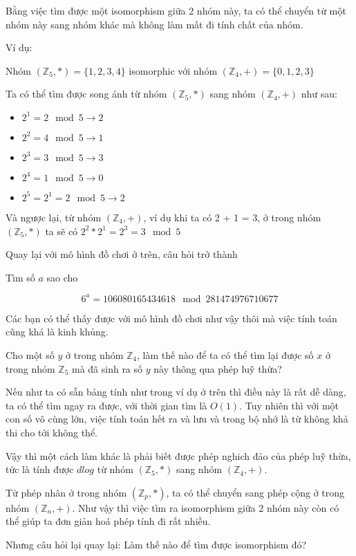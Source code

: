 \documentclass[a4paper,12pt]{article}
\begin{document}
Bằng việc tìm được một isomorphism giữa 2 nhóm này, ta có thể chuyển từ
một nhóm này sang nhóm khác mà không làm mất đi tính chất của nhóm.

Ví dụ:

\begin{mdframed}
    Nhóm \((\mathbb{Z}_5, *) = \{ 1,2,3,4\} \) isomorphic với nhóm \((\mathbb{Z}_4, +) = \{ 0,1,2,3 \} \)\

    Ta có thể tìm được song ánh từ nhóm \((\mathbb{Z}_5, *)\) sang nhóm \((\mathbb{Z}_4, +)\) như sau:
    \begin{itemize}
        \item \(2^1 = 2 \mod 5 \to 2\)
        \item \(2^2 = 4 \mod 5 \to 1\)
        \item \(2^3 = 3 \mod 5 \to 3\)
        \item \(2^4 = 1 \mod 5 \to 0\)
        \item \(2^5 = 2^1 = 2 \mod 5 \to 2\)
    \end{itemize}

    Và ngược lại, từ nhóm \((\mathbb{Z}_4, +)\), ví dụ khi ta có 2 + 1 = 3, ở trong
    nhóm \((\mathbb{Z}_5, *)\) ta sẽ có \(2^2 * 2^1 = 2^3 = 3 \mod 5\)
\end{mdframed}

Quay lại với mô hình đồ chơi ở trên, câu hỏi trở thành

Tìm số \(a\) sao cho

\[6^a = 106080165434618 \mod 281474976710677\]

Các bạn có thể thấy được với mô hình đồ chơi như vậy thôi mà việc tính toán cũng khá là kinh khủng.

Cho một số \(y\) ở trong nhóm \(\mathbb{Z}_4\), làm thế nào để ta có thể tìm lại được
số \(x\) ở trong nhóm \(\mathbb{Z}_5\) mà đã sinh ra số \(y\) này thông qua phép luỹ thừa?

Nếu như ta có sẵn bảng tính như trong ví dụ ở trên thì điều này là rất dễ dàng, ta có thể
tìm ngay ra được, với thời gian tìm là \(O(1)\). Tuy nhiên thì với một con số vô cùng lớn,
việc tính toán hết ra và lưu và trong bộ nhớ là từ không khả thi cho tới không thể.

Vậy thì một cách làm khác là phải biết được phép nghich đảo của phép luỹ thừa, tức là tính được \(dlog\)
từ nhóm \((\mathbb{Z}_5, *)\) sang nhóm \((\mathbb{Z}_4, +)\).

Từ phép nhân ở trong nhóm \((\mathbb{Z}_p, *)\), ta có thể chuyển sang phép cộng ở trong
nhóm \((\mathbb{Z}_n, +)\). Như vậy thì việc tìm ra isomorphism giữa 2 nhóm này còn
có thể giúp ta đơn giản hoá phép tính đi rất nhiều.

Nhưng câu hỏi lại quay lại: Làm thế nào để tìm được isomorphism đó?
\end{document}
